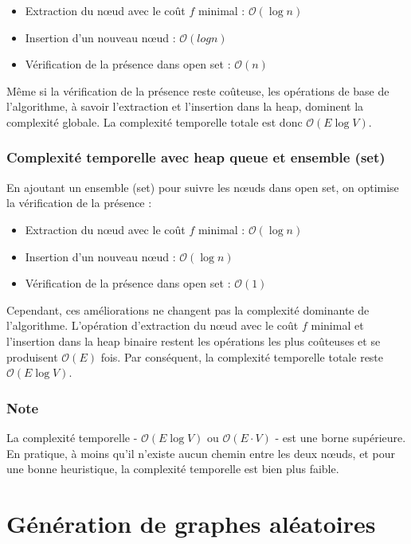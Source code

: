 \begin{itemize}
    \item Extraction du nœud avec le coût \( f \) minimal : $\mathcal{O}(\log n)$
    \item Insertion d'un nouveau nœud : $\mathcal{O}(log n)$
    \item Vérification de la présence dans open set : $\mathcal{O}(n)$
\end{itemize}

Même si la vérification de la présence reste coûteuse, les opérations de base de l'algorithme, à savoir l'extraction et l'insertion dans la heap, dominent la complexité globale. La complexité temporelle totale est donc $\mathcal{O}(E \log V)$.

\subsubsection*{Complexité temporelle avec heap queue et ensemble (set)}
En ajoutant un ensemble (set) pour suivre les nœuds dans open set, on optimise la vérification de la présence :

\begin{itemize}
    \item Extraction du nœud avec le coût \( f \) minimal : $\mathcal{O}(\log n)$
    \item Insertion d'un nouveau nœud : $\mathcal{O}(\log n)$
    \item Vérification de la présence dans open set : $\mathcal{O}(1)$
\end{itemize}

Cependant, ces améliorations ne changent pas la complexité dominante de l'algorithme. L'opération d'extraction du nœud avec le coût \( f \) minimal et l'insertion dans la heap binaire restent les opérations les plus coûteuses et se produisent $\mathcal{O}(E)$ fois. Par conséquent, la complexité temporelle totale reste $\mathcal{O}(E \log V)$.

\subsubsection*{Note}
La complexité temporelle - $\mathcal{O}(E \log V)$ ou $\mathcal{O}(E \cdot V)$ - est une borne supérieure. En pratique, à moins qu'il n'existe aucun chemin entre les deux nœuds, et pour une bonne heuristique, la complexité temporelle est bien plus faible.


\section{Génération de graphes aléatoires}
\label{sec:shortest_path_random_graph}

